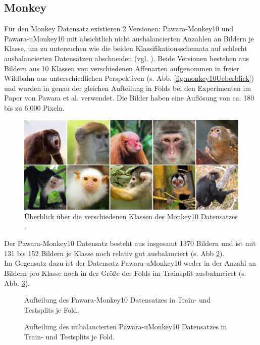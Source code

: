 \subsection{Monkey}
Für den Monkey Datensatz existieren 2 Versionen: Pawara-Monkey10 und Pawara-uMonkey10 mit absichtlich nicht ausbalancierten Anzahlen an Bildern je Klasse, um zu untersuchen wie die beiden Klassifikationsschemata auf schlecht ausbalancierten Datensätzen abschneiden (vgl. \cite{pawaraWebsiteDatensaetze}). Beide Versionen bestehen aus Bildern aus 10 Klassen von verschiedenen Affenarten aufgenommen in freier Wildbahn aus unterschiedlichen Perspektiven (s. Abb. \ref{fig:monkey10Ueberblick}) und wurden in genau der gleichen Aufteilung in Folds bei den Experimenten im Paper von Pawara et al. \cite{pawaraPaper} verwendet.
Die Bilder haben eine Auflösung von ca. 180 bis zu 6.000 Pixeln.
\begin{figure}[H]
\centering
\includegraphics[scale=0.08]{img/2_monkey10-image.jpg}
\caption{Überblick über die verschiedenen Klassen des Monkey10 Datensatzes \cite{pawaraMonkey}.}
\label{fig:monkeyUeberblick}
\end{figure}

Der Pawara-Monkey10 Datensatz besteht aus insgesamt 1370 Bildern und ist mit 131 bis 152 Bildern je Klasse noch relativ gut ausbalanciert (s. Abb \ref{fig:Pawara-Monkey10Zusammensetzung}).\\

Im Gegensatz dazu ist der Datensatz Pawara-uMonkey10 weder in der Anzahl an Bildern pro Klasse noch in der Größe der Folds im Trainsplit ausbalanciert (s. Abb. \ref{fig:Pawara-uMonkey10Zusammensetzung}). 


\begin{figure}[H]
\begin{adjustbox}{width=1.4\textwidth, center}

\end{adjustbox}
\caption{Aufteilung des Pawara-Monkey10 Datensatzes \cite{pawaraWebsiteDatensaetze} in Train- und Testsplits je Fold.}
\label{fig:Pawara-Monkey10Zusammensetzung}
\end{figure}
\begin{figure}[H]
\begin{adjustbox}{width=1.4\textwidth, center}

\end{adjustbox}
\caption{Aufteilung des unbalancierten Pawara-uMonkey10 Datensatzes \cite{pawaraWebsiteDatensaetze} in Train- und Testsplits je Fold.}
\label{fig:Pawara-uMonkey10Zusammensetzung}
\end{figure}





